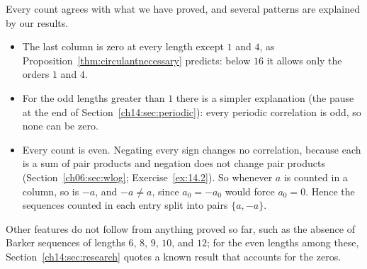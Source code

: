 Every count agrees with what we have proved, and several patterns are explained by our results.
\begin{itemize}
\item The last column is zero at every length except $1$ and $4$, as Proposition~\ref{thm:circulantnecessary} predicts: below $16$ it allows only the orders $1$ and $4$.
\item For the odd lengths greater than $1$ there is a simpler explanation (the pause at the end of Section~\ref{ch14:sec:periodic}): every periodic correlation is odd, so none can be zero.
\item Every count is even. Negating every sign changes no correlation, because each is a sum of pair products and negation does not change pair products (Section~\ref{ch06:sec:wlog}; Exercise~\ref{ex:14.2}). So whenever $a$ is counted in a column, so is $-a$, and $-a\ne a$, since $a_0=-a_0$ would force $a_0=0$. Hence the sequences counted in each entry split into pairs $\{a,-a\}$.
\end{itemize}
Other features do not follow from anything proved so far, such as the absence of Barker sequences of lengths $6$, $8$, $9$, $10$, and $12$; for the even lengths among these, Section~\ref{ch14:sec:research} quotes a known result that accounts for the zeros.
